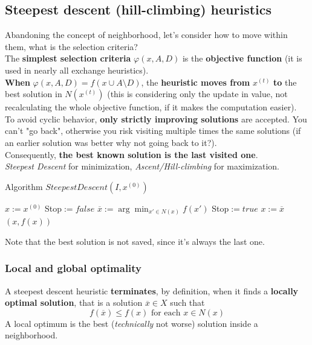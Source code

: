 \newpage

\subsection{Steepest descent (hill-climbing) heuristics}
Abandoning the concept of neighborhood, let's consider how to move within them, what is the selection criteria?\\

The \textbf{simplest selection criteria} $\varphi (x, A, D)$ is the \textbf{objective function} (it is used in nearly all exchange heuristics).\\

\textbf{When} $\varphi (x, A, D) = f (x \cup A \setminus D)$, the \textbf{heuristic moves from} $x^{(t)}$ \textbf{to} the best solution in $N (x^{(t)})$ (this is considering only the update in value, not recalculating the whole objective function, if it makes the computation easier).\\

To avoid cyclic behavior, \textbf{only strictly improving solutions} are accepted. You can't "go back", otherwise you risk visiting multiple times the same solutions (if an earlier solution was better why not going back to it?).\\
Consequently, \textbf{the best known solution is the last visited one}.\\

\textit{Steepest Descent} for minimization, \textit{Ascent/Hill-climbing} for maximization.
\begin{algorithm}
	\caption{Algorithm $SteepestDescent(I , x^{(0)})$}
	\begin{algorithmic}
		\STATE $x := x^{(0)}$
		\STATE Stop$ := false$
		\STATE $\overline{x} := \arg \min_{x' \in N(x)} f(x')$
		\STATE Stop$ := true$
		\ELSE 
		\STATE $x := \overline{x}$
		\ENDIF
		\ENDWHILE
		\RETURN $(x, f (x))$
	\end{algorithmic}
\end{algorithm}
Note that the best solution is not saved, since it's always the last one.\\

\newpage

\subsubsection{Local and global optimality}
A steepest descent heuristic \textbf{terminates}, by definition, when it finds a \textbf{locally optimal solution}, that is a solution $\overline{x} \in X$ such that
$$ f (\overline{x}) \leq f (x) \text{ for each } x \in N (x) $$
A local optimum is the best (\textit{technically} not worse) solution inside a neighborhood. 

